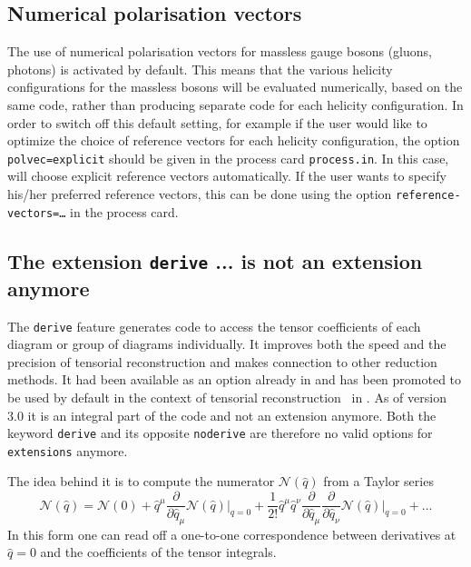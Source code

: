 \subsection{Numerical polarisation vectors}
\label{sec:numpolvec}
The use of numerical polarisation vectors for massless gauge bosons
(gluons, photons) is activated by default.  This means that the
various helicity configurations for the massless bosons will be
evaluated numerically, based on the same code, rather than producing
separate code for each helicity configuration.  In order to switch off
this default setting,
for example if the user would like to 
optimize the choice of reference vectors for each helicity configuration,
the option \texttt{polvec=explicit} should be given in the process card 
\texttt{process.in}.
In this case, \gosam{} will choose explicit reference vectors automatically.
If the user wants to specify his/her preferred reference vectors, 
this can be done using the option \texttt{reference-vectors=\ldots}
in the process card.

\subsection{The extension \texttt{derive} ... is not an extension anymore}
\label{sec:derive}

The \texttt{derive} feature generates code to access the tensor coefficients
of each diagram or group of diagrams individually. It improves both the speed and the precision of tensorial reconstruction and makes connection to other reduction methods. It had been available as an option already in  and has been promoted to be used by default in the context of  tensorial reconstruction~\cite{Heinrich:2010ax} in . As of version 3.0 it is an integral part of the code and not an extension anymore. Both the keyword \texttt{derive} and its opposite \texttt{noderive} are therefore no valid options for \texttt{extensions} anymore.

The idea behind it is to compute the numerator $\mathcal{N}(\hat{q})$ 
from a Taylor series
\begin{equation}
\mathcal{N}(\hat{q})=\mathcal{N}(0)
+ \hat{q}^\mu
  \frac{\partial}{\partial\hat{q}_\mu}\mathcal{N}(\hat{q})\vert_{q=0}
+ \frac1{2!}\hat{q}^\mu\hat{q}^\nu
  \frac{\partial}{\partial\hat{q}_\mu}
  \frac{\partial}{\partial\hat{q}_\nu}
  \mathcal{N}(\hat{q})\vert_{q=0} + \ldots
\end{equation}
In this form one can read off a one-to-one correspondence between derivatives at
$\hat{q}=0$ and the coefficients of the tensor integrals.

